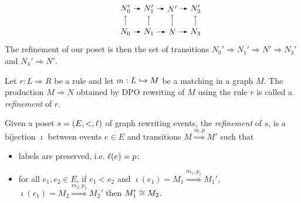 \begin{example}
\[\begin{tikzpicture}
\end{tikzpicture}
\qquad
\begin{tikzpicture} %
  \node (n0) at (1,0) {\(N_0\)};
  \node (n1) at (2,0) {\(N_1\)};
  \node (n) at (3,0) {\(N\)};
  \node (n3) at (4,0) {\(N_3\)};
  \node (np0) at (1,1) {\(N_0'\)};
  \node (np1) at (2,1) {\(N_1'\)};
  \node (np) at (3,1) {\(N'\)};
  \node (np3) at (4,1) {\(N_3'\)};
  \draw [>=latex, ->] (n0) -- (n1);
  \draw [>=latex, ->] (n1) -- (n);
  \draw [>=latex, ->] (n) -- (n3);
  \draw [>=latex, ->] (np0) -- (np1);
  \draw [>=latex, ->] (np1) -- (np);
  \draw [>=latex, ->] (np) -- (np3);
  \draw [->] (n0) -- (np0);
  \draw [->] (n1) -- (np1);
  \draw [->] (n) -- (np);
  \draw [->] (n3) -- (np3);
\end{tikzpicture}
\]
The refinement of our poset is then the set of transitions $N_0'\Rightarrow N_1'\Rightarrow N'\Rightarrow N_3'$ and $N_4'\Rightarrow N'$.

\end{example}

\begin{definition}
  Let $r:L{\Rightarrow} R$ be a rule and let $m:L\hookrightarrow M$ be a matching in a graph $M$. The production $M\Rightarrow N$ obtained by DPO rewriting of $M$ using the rule $r$ is called a \emph{refinement} of $r$.
\end{definition}

\begin{definition}
  Given a poset $s=(E,<,\ell)$ of graph rewriting events, the \emph{refinement} of $s$, is a bijection $\imath$ between events $e\in E$ and transitions $M\overset{m,p}{\Rightarrow} M'$ such that
  \begin{itemize}
  \item labels are preserved, i.e. $\ell(e)=p$;
  \item  for all $e_1,e_2\in E$, if $e_1<e_2$ and $\imath(e_1) = M_1\overset{m_1,p_1}{\Rightarrow} M_1'$, $\imath(e_1) =M_2\overset{m_2,p_2}{\Rightarrow} M_2'$ then $M_1'\cong M_2$.
  \end{itemize}
\end{definition}


